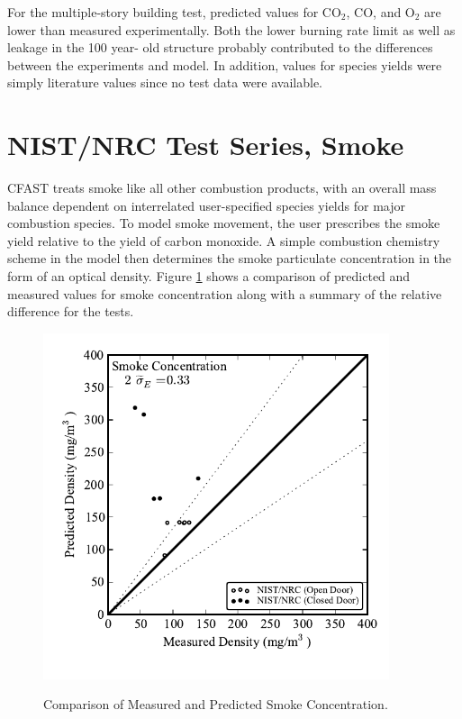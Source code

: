 For the multiple-story building test, predicted values for CO$_2$, CO, and O$_2$ are lower than 
measured experimentally.  Both the lower burning rate limit as well as leakage in the 100 year- 
old structure probably contributed to the differences between the experiments and model.  In 
addition, values for species yields were simply literature values since no test data were available.

\section{NIST/NRC Test Series, Smoke}

CFAST treats smoke like all other combustion products, with an overall mass balance dependent on interrelated user-specified species yields for major combustion species.  To model smoke movement, the user prescribes the smoke yield relative to the yield of carbon monoxide.  A simple combustion chemistry scheme in the model then determines the smoke particulate concentration in the form of an optical density.  Figure \ref{fig:Smoke_Scatter} shows a comparison of predicted and measured values for smoke concentration along with a summary of the relative difference for the tests.

\begin{figure}
\begin{center}
\includegraphics[width=4.0in]{FIGURES/ScatterPlots/Smoke_Concentration}  \\
\end{center}
\caption{Comparison of Measured and Predicted Smoke Concentration.} \label{fig:Smoke_Scatter}
\end{figure}

